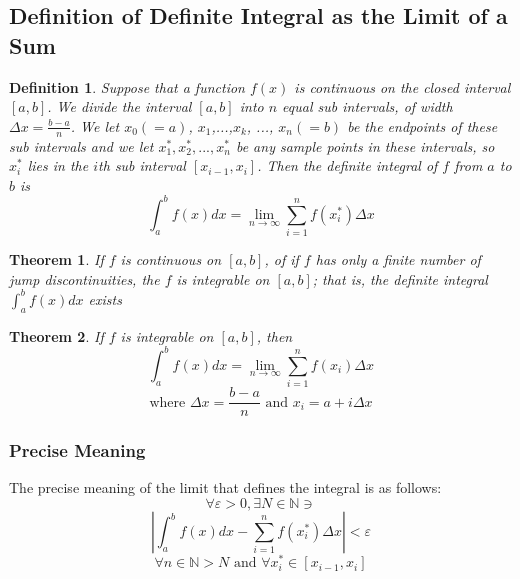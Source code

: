 \documentclass[10pt]{report}
\newtheorem{thm3}{Theorem}[subsection]
\newtheorem{def3}{Definition}[subsection]
\newcommand{\eps}{\varepsilon}
\begin{document}
\subsection{Definition of Definite Integral as the Limit of a Sum}
\begin{def3}
Suppose that a function $f(x)$ is continuous on the closed interval $[a,b]$. We divide the interval $[a,b]$ into $n$ equal sub intervals, of width $\Delta x= \frac{b-a}{n}$. We let $x_0 (=a)$, $x_1$,...,$x_k$, ..., $x_n(=b)$ be the endpoints of these sub intervals and we let $x_1^*, x_2^*,..., x_n^*$ be any sample points in these intervals, so $x_i^*$ lies in the $i$th sub interval $[x_{i-1},x_i]$. Then the definite integral of $f$ from $a$ to $b$ is
$$\int_a^b f(x)dx = \lim_{n\to\infty}\sum_{i=1}^n f(x_i^*)\Delta x$$
\end{def3}
\begin{thm3}
If $f$ is continuous on $[a,b]$, of if $f$ has only a finite number of jump discontinuities, the $f$ is integrable on $[a,b]$; that is, the definite integral $\int_a^b f(x)dx$ exists
\end{thm3}
\begin{thm3}
If $f$ is integrable on $[a,b]$, then
$$\int_a^b f(x)dx=\lim_{n\to\infty}\sum_{i=1}^n f(x_i)\Delta x$$
$$\text{where } \Delta x=\frac{b-a}{n}\text{  and  } x_i=a+i\Delta x$$
\end{thm3}
\subsubsection{Precise Meaning}
The precise meaning of the limit that defines the integral is as follows:
$$\forall\eps>0, \exists N\in\mathbb{N}\ni$$
$$\left|\int_a^bf(x)dx - \sum_{i=1}^nf(x_i^*)\Delta x\right|<\eps$$
$$\forall n\in\mathbb{N}>N \text{ and } \forall x_i^*\in[x_{i-1},x_i]$$
\end{document}
